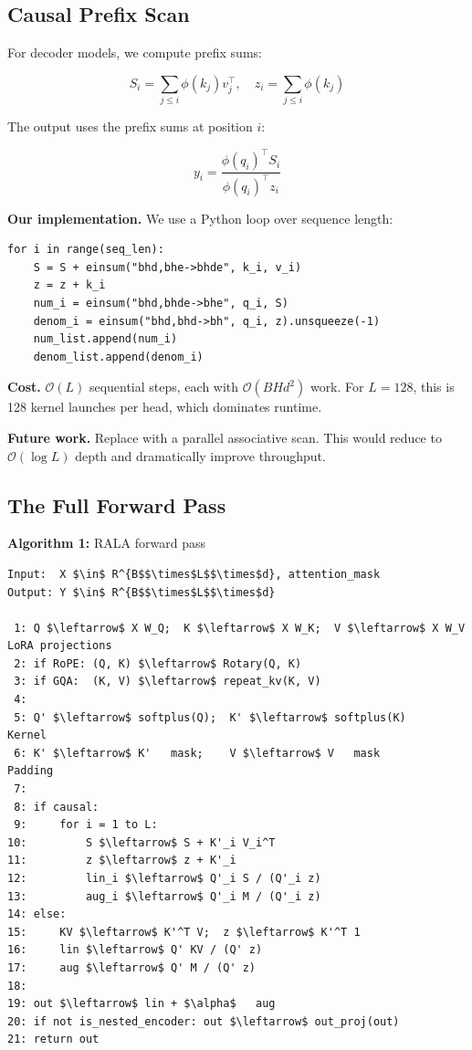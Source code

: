 \subsection{Causal Prefix Scan}

For decoder models, we compute prefix sums:

\[
S_i = \sum_{j \le i} \phi(k_j) v_j^\top, \quad
z_i = \sum_{j \le i} \phi(k_j)
\tag{4.6}
\]

The output uses the prefix sums at position $i$:

\[
y_i = \frac{\phi(q_i)^\top S_i}{\phi(q_i)^\top z_i}
\tag{4.7}
\]

\textbf{Our implementation.} We use a Python loop over sequence length:

\begin{lstlisting}
for i in range(seq_len):
    S = S + einsum("bhd,bhe->bhde", k_i, v_i)
    z = z + k_i
    num_i = einsum("bhd,bhde->bhe", q_i, S)
    denom_i = einsum("bhd,bhd->bh", q_i, z).unsqueeze(-1)
    num_list.append(num_i)
    denom_list.append(denom_i)
\end{lstlisting}

\textbf{Cost.} $\mathcal{O}(L)$ sequential steps, each with $\mathcal{O}(BH d^2)$ 
work. For $L = 128$, this is 128 kernel launches per head, which dominates 
runtime.

\textbf{Future work.} Replace with a parallel associative scan. This would reduce 
to $\mathcal{O}(\log L)$ depth and dramatically improve throughput.

\subsection{The Full Forward Pass}

\textbf{Algorithm 1:} RALA forward pass
\begin{lstlisting}
Input:  X $\in$ R^{B$$\times$L$$\times$d}, attention_mask
Output: Y $\in$ R^{B$$\times$L$$\times$d}

 1: Q $\leftarrow$ X W_Q;  K $\leftarrow$ X W_K;  V $\leftarrow$ X W_V      LoRA projections
 2: if RoPE: (Q, K) $\leftarrow$ Rotary(Q, K)
 3: if GQA:  (K, V) $\leftarrow$ repeat_kv(K, V)
 4:
 5: Q' $\leftarrow$ softplus(Q);  K' $\leftarrow$ softplus(K)     Kernel
 6: K' $\leftarrow$ K'   mask;    V $\leftarrow$ V   mask         Padding
 7:
 8: if causal:
 9:     for i = 1 to L:
10:         S $\leftarrow$ S + K'_i V_i^T
11:         z $\leftarrow$ z + K'_i
12:         lin_i $\leftarrow$ Q'_i S / (Q'_i z)
13:         aug_i $\leftarrow$ Q'_i M / (Q'_i z)
14: else:
15:     KV $\leftarrow$ K'^T V;  z $\leftarrow$ K'^T 1
16:     lin $\leftarrow$ Q' KV / (Q' z)
17:     aug $\leftarrow$ Q' M / (Q' z)
18:
19: out $\leftarrow$ lin + $\alpha$   aug
20: if not is_nested_encoder: out $\leftarrow$ out_proj(out)
21: return out
\end{lstlisting}

